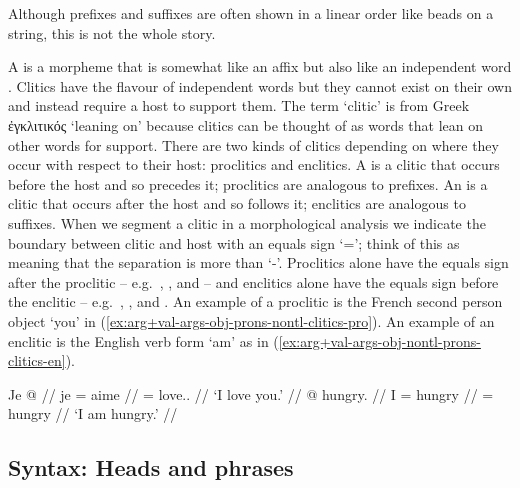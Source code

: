 Although prefixes and suffixes are often shown in a linear order like beads on a string, this is not the whole story.


A  is a morpheme that is somewhat like an affix but also like an independent word \parencite[166]{booij:2007}.
Clitics have the flavour of independent words but they cannot exist on their own and instead require a host to support them.
The term ‘clitic’ is from Greek ἐγκλιτικός  ‘leaning on’ because clitics can be thought of as words that lean on other words for support.
There are two kinds of clitics depending on where they occur with respect to their host: proclitics and enclitics.
A  is a clitic that occurs before the host and so precedes it; proclitics are analogous to prefixes.
An  is a clitic that occurs after the host and so follows it; enclitics are analogous to suffixes.
When we segment a clitic in a morphological analysis we indicate the boundary between clitic and host with an equals sign ‘=’; think of this as meaning that the separation is more than ‘-’.
Proclitics alone have the equals sign after the proclitic – e.g.\ , , and  – and enclitics alone have the equals sign before the enclitic – e.g.\ , , and .
An example of a proclitic is the French second person object  ‘you’ in (\ref{ex:arg+val-args-obj-prons-nontl-clitics-pro}).
An example of an enclitic is the English verb form  ‘am’ as in (\ref{ex:arg+val-args-obj-nontl-prons-clitics-en}).

\pex\label{exx:arg+val-args-obj-prons-nontl-clitics}%
\a\label{ex:arg+val-args-obj-prons-nontl-clitics-pro}%
%
\begingl
	\gla	Je  @ {} //
	\glb	je = aime //
	\glc	{} = love.. //
	\glft	‘I love you.’
		//
\endgl
\a\label{ex:arg+val-args-obj-nontl-prons-clitics-en}%
%
\begingl
	\gla	{} @ {} hungry. //
	\glb	I = hungry //
	\glc	{} = hungry //
	\glft	‘I am hungry.’
		//
\endgl
\xe


\subsection{Syntax: Heads and phrases}\label{sec:intro-ling-synx}


